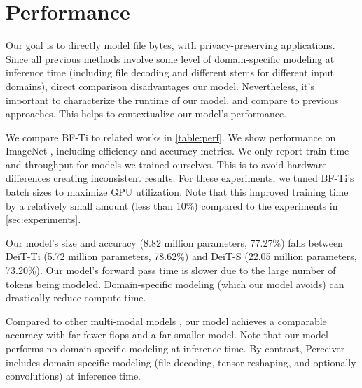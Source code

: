 \appendix
\section{Performance} \label{sec:performance}
Our goal is to directly model file bytes, with privacy-preserving applications. Since all previous methods involve some level of domain-specific modeling at inference time (including file decoding and different stems for different input domains), direct comparison disadvantages our model. Nevertheless, it's important to characterize the runtime of our model, and compare to previous approaches. This helps to contextualize our model's performance.

We compare BF-Ti to related works in \autoref{table:perf}. We show performance on ImageNet \cite{imagenet}, including efficiency and accuracy metrics. We only report train time and throughput for models we trained ourselves. This is to avoid hardware differences creating inconsistent results. For these experiments, we tuned BF-Ti's batch sizes to maximize GPU utilization. Note that this improved training time by a relatively small amount (less than 10\%) compared to the experiments in \autoref{sec:experiments}.

Our model's size and accuracy (8.82 million parameters, 77.27\%) falls between DeiT-Ti (5.72 million parameters, 78.62\%) and DeiT-S (22.05 million parameters, 73.20\%). Our model's forward pass time is slower due to the large number of tokens being modeled. Domain-specific modeling (which our model avoids) can drastically reduce compute time.

Compared to other multi-modal models \cite{perceiver,perceiverio}, our model achieves a comparable accuracy with far fewer flops and a far smaller model. Note that our model performs no domain-specific modeling at inference time. By contrast, Perceiver includes domain-specific modeling (file decoding, tensor reshaping, and optionally convolutions) at inference time.

